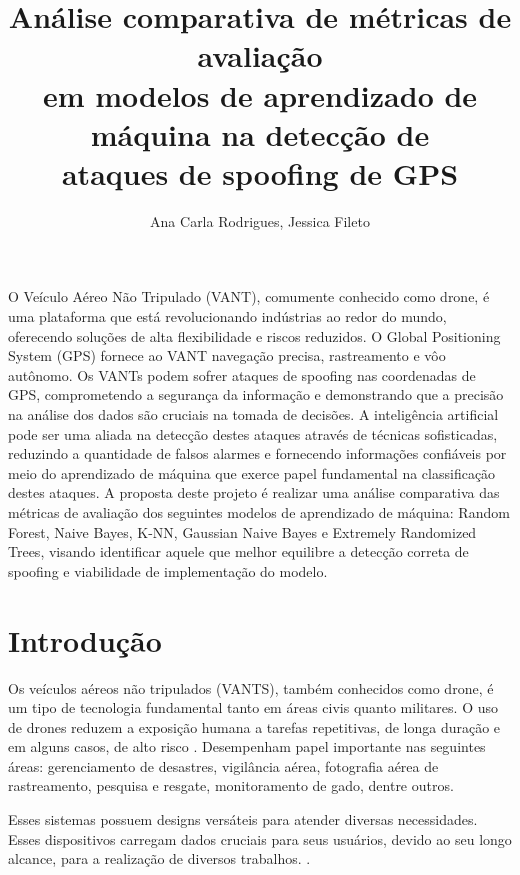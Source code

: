 \documentclass[12pt]{article}
\title{Análise comparativa de métricas de avaliação\\
em modelos de aprendizado de máquina na detecção de\\
ataques de spoofing de GPS
}
\author{Ana Carla Rodrigues\inst{1}, Jessica Fileto\inst{1}}
\begin{document}
\maketitle
     
\begin{resumo} 
O Veículo Aéreo Não Tripulado (VANT), comumente conhecido como drone, é uma
plataforma que está revolucionando indústrias ao redor do mundo, oferecendo 
soluções de alta flexibilidade e riscos reduzidos. O Global Positioning System 
(GPS) fornece ao VANT navegação precisa, rastreamento e vôo autônomo. Os VANTs 
podem sofrer ataques de spoofing nas coordenadas de GPS, comprometendo a 
segurança da informação e demonstrando que a precisão na análise dos dados são 
cruciais na tomada de decisões. A inteligência artificial pode ser uma aliada 
na detecção destes ataques através de técnicas sofisticadas, reduzindo a 
quantidade de falsos alarmes e fornecendo informações confiáveis por meio do 
aprendizado de máquina que exerce papel fundamental na classificação destes 
ataques. A proposta deste projeto é realizar uma análise comparativa das 
métricas de avaliação dos seguintes modelos de aprendizado de máquina: Random 
Forest, Naive Bayes, K-NN, Gaussian Naive Bayes e Extremely Randomized Trees, visando identificar 
aquele que melhor equilibre a detecção correta de spoofing e viabilidade de 
implementação do modelo.
\end{resumo}

\section{Introdução}


Os veículos aéreos não tripulados (VANTS), também conhecidos como drone,
é um tipo de tecnologia fundamental tanto em áreas civis quanto militares.
O uso de drones reduzem a exposição humana a tarefas repetitivas, de longa duração e em alguns casos, de alto risco \cite{dialogos}.
Desempenham papel importante nas seguintes áreas: gerenciamento de desastres, vigilância aérea, fotografia aérea de rastreamento, pesquisa e resgate,
monitoramento de gado, dentre outros. \cite{titounaLightweightSecurityTechnique2021} 

Esses sistemas possuem designs versáteis para atender diversas necessidades.
Esses dispositivos carregam dados cruciais para seus usuários, devido ao seu longo alcance,
para a realização de diversos trabalhos. \cite{khan}. 
\end{document}

